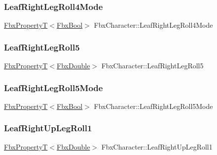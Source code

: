 \subsubsection{\texorpdfstring{Leaf\+Right\+Leg\+Roll4\+Mode}{LeafRightLegRoll4Mode}}
{\footnotesize\ttfamily \hyperlink{class_fbx_property_t}{Fbx\+PropertyT}$<$\hyperlink{fbxtypes_8h_a92e0562b2fe33e76a242f498b362262e}{Fbx\+Bool}$>$ Fbx\+Character\+::\+Leaf\+Right\+Leg\+Roll4\+Mode}

\mbox{\label{class_fbx_character_a008a02d8cc33a281a0ffc947a20e5cb1}} 
\subsubsection{\texorpdfstring{Leaf\+Right\+Leg\+Roll5}{LeafRightLegRoll5}}
{\footnotesize\ttfamily \hyperlink{class_fbx_property_t}{Fbx\+PropertyT}$<$\hyperlink{fbxtypes_8h_a171e72a1c46fc15c1a6c9c31948c1c5b}{Fbx\+Double}$>$ Fbx\+Character\+::\+Leaf\+Right\+Leg\+Roll5}

\mbox{\label{class_fbx_character_a91f415ab396f861adcfbe5468514d7ec}} 
\subsubsection{\texorpdfstring{Leaf\+Right\+Leg\+Roll5\+Mode}{LeafRightLegRoll5Mode}}
{\footnotesize\ttfamily \hyperlink{class_fbx_property_t}{Fbx\+PropertyT}$<$\hyperlink{fbxtypes_8h_a92e0562b2fe33e76a242f498b362262e}{Fbx\+Bool}$>$ Fbx\+Character\+::\+Leaf\+Right\+Leg\+Roll5\+Mode}

\mbox{\label{class_fbx_character_a953eee696f80e4e09e25e0e43b120935}} 
\subsubsection{\texorpdfstring{Leaf\+Right\+Up\+Leg\+Roll1}{LeafRightUpLegRoll1}}
{\footnotesize\ttfamily \hyperlink{class_fbx_property_t}{Fbx\+PropertyT}$<$\hyperlink{fbxtypes_8h_a171e72a1c46fc15c1a6c9c31948c1c5b}{Fbx\+Double}$>$ Fbx\+Character\+::\+Leaf\+Right\+Up\+Leg\+Roll1}

